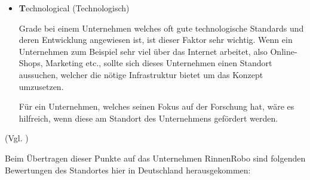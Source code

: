 \begin{itemize}
                \item \textbf Technological (Technologisch)
                
                    Grade bei einem Unternehmen welches oft gute technologische Standards und deren Entwicklung angewiesen 
                    ist, ist dieser Faktor sehr wichtig. Wenn ein Unternehmen zum Beispiel sehr viel über das Internet 
                    arbeitet, also Online-Shops, Marketing etc., sollte sich dieses Unternehmen einen Standort aussuchen,
                    welcher die nötige Infrastruktur bietet um das Konzept umzusetzen.
    
                    Für ein Unternehmen, welches seinen Fokus auf der Forschung hat, wäre es hilfreich, wenn diese am
                    Standort des Unternehmens gefördert werden.
            \end{itemize}
            (Vgl. \cite{Schomaker2019})
    
        Beim Übertragen dieser Punkte auf das Unternehmen RinnenRobo sind folgenden Bewertungen des Standortes hier in
        Deutschland herausgekommen:
    
